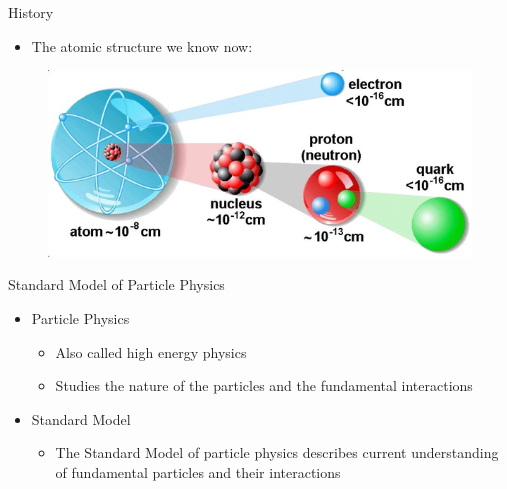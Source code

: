\documentclass[10pt]{beamer}
\begin{document}
\begin{frame}{History}
    \begin{itemize}
        \item The atomic structure we know now:
    \end{itemize}
    \begin{figure}
        \includegraphics[scale=0.5]{figures/atom_structure.png}
    \end{figure}
\end{frame}

\begin{frame}{Standard Model of Particle Physics}
    \begin{itemize}
        \item Particle Physics
        \begin{itemize}
            \item Also called high energy physics
            \item Studies the nature of the particles and the fundamental interactions
        \end{itemize}
        \item Standard Model
        \begin{itemize}
            \item The Standard Model of particle physics describes current understanding of fundamental particles and their interactions
        \end{itemize}
    \end{itemize}
\end{frame}
\end{document}
